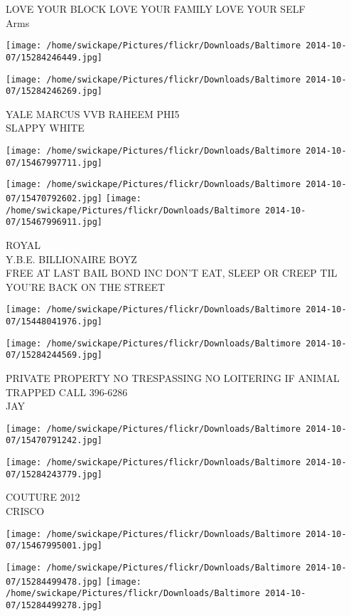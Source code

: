 \documentclass[10pt,letterpaper]{article}
\begin{document}
LOVE YOUR BLOCK LOVE YOUR FAMILY LOVE YOUR SELF\\
Arms
\pagebreak

\texttt{[image: /home/swickape/Pictures/flickr/Downloads/Baltimore 2014-10-07/15284246449.jpg]}

\vspace{0.25in}
\texttt{[image: /home/swickape/Pictures/flickr/Downloads/Baltimore 2014-10-07/15284246269.jpg]}

YALE MARCUS VVB RAHEEM PHI5\\
SLAPPY WHITE
\pagebreak

\texttt{[image: /home/swickape/Pictures/flickr/Downloads/Baltimore 2014-10-07/15467997711.jpg]}

\vspace{0.25in}
\texttt{[image: /home/swickape/Pictures/flickr/Downloads/Baltimore 2014-10-07/15470792602.jpg]}
\texttt{[image: /home/swickape/Pictures/flickr/Downloads/Baltimore 2014-10-07/15467996911.jpg]}

ROYAL\\
Y.B.E. BILLIONAIRE BOYZ\\
FREE AT LAST BAIL BOND INC DON'T EAT, SLEEP OR CREEP TIL YOU'RE BACK ON THE STREET
\pagebreak

\texttt{[image: /home/swickape/Pictures/flickr/Downloads/Baltimore 2014-10-07/15448041976.jpg]}

\vspace{0.25in}
\texttt{[image: /home/swickape/Pictures/flickr/Downloads/Baltimore 2014-10-07/15284244569.jpg]}

PRIVATE PROPERTY NO TRESPASSING NO LOITERING IF ANIMAL TRAPPED CALL 396{-}6286\\
JAY
\pagebreak

\texttt{[image: /home/swickape/Pictures/flickr/Downloads/Baltimore 2014-10-07/15470791242.jpg]}

\vspace{0.25in}
\texttt{[image: /home/swickape/Pictures/flickr/Downloads/Baltimore 2014-10-07/15284243779.jpg]}

COUTURE 2012\\
CRISCO
\pagebreak

\texttt{[image: /home/swickape/Pictures/flickr/Downloads/Baltimore 2014-10-07/15467995001.jpg]}

\vspace{0.25in}
\texttt{[image: /home/swickape/Pictures/flickr/Downloads/Baltimore 2014-10-07/15284499478.jpg]}
\texttt{[image: /home/swickape/Pictures/flickr/Downloads/Baltimore 2014-10-07/15284499278.jpg]}
\end{document}
